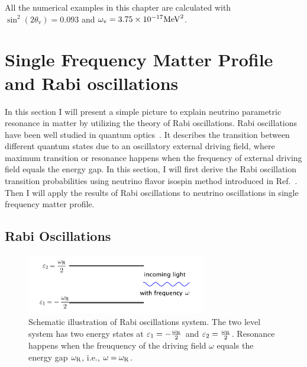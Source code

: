 All the numerical examples in this chapter are calculated with $\sin^2(2\theta_{\mathrm v}) = 0.093$ and $\omega_{\mathrm v} = 3.75\times 10^{-17}\mathrm{MeV}^2$.






\section{\label{chap:matter-sec:single}Single Frequency Matter Profile and Rabi oscillations}%


In this section I will present a simple picture to explain neutrino parametric resonance in matter by utilizing the theory of Rabi oscillations. Rabi oscillations have been well studied in quantum optics~\cite{Boyd2008}. It describes the transition between different quantum states due to an oscillatory external driving field, where maximum transition or resonance happens when the frequency of external driving field equals the energy gap. In this section, I will first derive the Rabi oscillation transition probabilities using neutrino flavor isospin method introduced in Ref.~\cite{Duan2006a}. Then I will apply the results of Rabi oscillations to neutrino oscillations in single frequency matter profile.


\subsection{\label{chap:app-sec:rabi-oscillations}Rabi Oscillations}

\begin{figure}[htbp]
    \centering
    \includegraphics[width=0.7\textwidth]{chapters/assets/matter/rabi-illustrative-diagram}
    \caption{Schematic illustration of Rabi oscillations system. The two level system has two energy states at $\varepsilon_1=-\frac{\omega_\mathrm R}{2}$ and $\varepsilon_2=\frac{\omega_\mathrm R}{2}$. Resonance happens when the freuquency of the driving field $\omega$ equals the energy gap $\omega_\mathrm R$, i.e., $\omega = \omega_\mathrm R$.}
    \label{chap:app-sec:rabi-oscillations-fig:rabi-diagram}
\end{figure}

